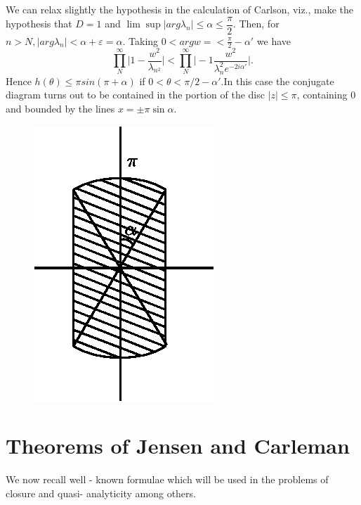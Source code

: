 \noindent 
\begin{minipage}[c]{5.8cm}
\quad We can relax slightly the hypothesis in the calculation of Carlson,
viz., make the hypothesis that $D = 1$ and $\lim \sup | arg \lambda_n
| \le \alpha \le \dfrac{\pi}{2}$. Then, for $n > N, |arg \lambda_n| <
\alpha + \varepsilon = \alpha$. Taking $0 < arg w = < \frac{\pi}{2} -
\alpha'$ we have 
$$
\prod^\infty_N \bigg |1- \frac{w^2}{\lambda_{n^2}} \bigg| <
\prod^\infty_N \bigg | -1 \frac {w^2}{\lambda_n^2 e^{- 2i
 \alpha'}}\bigg |. 
$$
Hence $h(\theta) \le \pi sin (\pi + \alpha)$ if $0 < \theta < \pi/2 -
\alpha'$.In this case the conjugate diagram turns out to be contained
in the portion of the disc $|z| \le \pi$, containing $0$ and bounded
by the lines $x = \pm \pi \sin \alpha$. 
\end{minipage}
\begin{minipage}[c]{5cm}
\begin{figure}[H]
\centerline{\includegraphics{vol15-figures/fig15-3.eps}}
\end{figure}
\end{minipage}

\section{Theorems of Jensen and Carleman}\label{chap10:sec2}%

We now recall well - known formulae which will be used in the problems
of closure and quasi- analyticity among others. 

